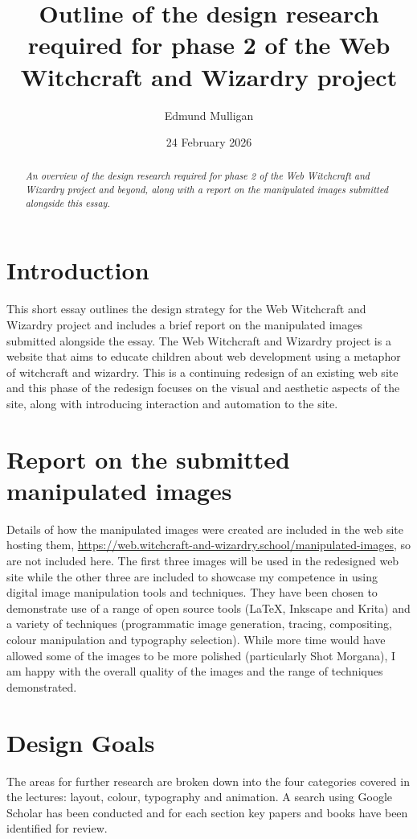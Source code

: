 \documentclass[a4paper, 12pt]{article}
\title{Outline of the design research required for phase 2 of the Web Witchcraft and Wizardry project}
\author{Edmund Mulligan}
\date{24 February 2026}
\begin{document}


\maketitle

\begin{abstract}
\textit{An overview of the design research required for phase 2 of the Web Witchcraft and Wizardry project and beyond, along with a report on the manipulated images submitted alongside this essay.}
\end{abstract}

\section{Introduction}

This short essay outlines the design strategy for the Web Witchcraft and Wizardry project and includes a brief report on the manipulated images submitted alongside the essay. The Web Witchcraft and Wizardry project is a website that aims to educate children about web development using a metaphor of witchcraft and wizardry. This is a continuing redesign of an existing web site and this phase of the redesign focuses on the visual and aesthetic aspects of the site, along with introducing interaction and automation to the site.

\section{Report on the submitted manipulated images}
Details of how the manipulated images were created are included in the web site hosting them, \url{https://web.witchcraft-and-wizardry.school/manipulated-images}, so are not included here. The first three images will be used in the redesigned web site while the other three are included to showcase my competence in using digital image manipulation tools and techniques. They have been chosen to demonstrate use of a range of open source tools (LaTeX, Inkscape and Krita) and a variety of techniques (programmatic image generation, tracing, compositing, colour manipulation and typography selection). While more time would have allowed some of the images to be more polished (particularly Shot Morgana), I am happy with the overall quality of the images and the range of techniques demonstrated.

\section{Design Goals}
The areas for further research are broken down into the four categories covered in the lectures: layout, colour, typography and animation. A search using Google Scholar has been conducted and for each section key papers and books  have been identified for review.
\end{document}
